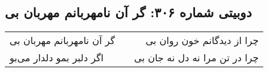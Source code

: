 \begin{center}
\section*{دوبیتی شماره ۳۰۶: گر آن نامهربانم مهربان بی}
\label{sec:306}
\begin{longtable}{l p{0.5cm} r}
گر آن نامهربانم مهربان بی
&&
چرا از دیدگانم خون روان بی
\\
اگر دلبر بمو دلدار می‌بو
&&
چرا در تن مرا نه دل نه جان بی
\\
\end{longtable}
\end{center}
